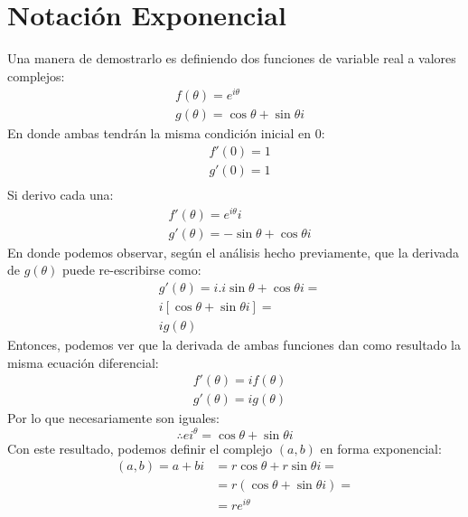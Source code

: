 \documentclass[12pt, twocolumn]{article}
\begin{document}
\section{Notación Exponencial}
Una manera de demostrarlo es definiendo dos funciones de variable real a valores complejos:
\begin{equation*}
    \begin{aligned}
        &f(\theta)=e^{i\theta}\\
        &g(\theta)=\cos{\theta}+\sin{\theta}i
    \end{aligned}
\end{equation*}
En donde ambas tendrán la misma condición inicial en 0:
\begin{equation*}
    \begin{aligned}
        &f'(0)=1\\
        &g'(0)=1\\
    \end{aligned}
\end{equation*}
Si derivo cada una:
\begin{equation*}
    \begin{aligned}
        &f'(\theta)=e^{i\theta}i\\
        &g'(\theta)=-\sin{\theta}+\cos{\theta}i
    \end{aligned}
\end{equation*}
En donde podemos observar, según el análisis hecho previamente, que la derivada de $g(\theta)$ puede re-escribirse como:
\begin{equation*}
    \begin{aligned}
        &g'(\theta)=i.i\sin{\theta}+\cos{\theta}i=\\
        &i[\cos{\theta}+\sin{\theta}i]=\\    
        &ig(\theta)
    \end{aligned}
\end{equation*}  
Entonces, podemos ver que la derivada de ambas funciones dan como resultado la misma ecuación diferencial:
\begin{equation*}
    \begin{aligned}
        &f'(\theta)=if(\theta)\\
        &g'(\theta)=ig(\theta)     
    \end{aligned}
\end{equation*} 
Por lo que necesariamente son iguales:
$$\therefore ei^{\theta}=\cos{\theta}+\sin{\theta}i$$
Con este resultado, podemos definir el complejo $(a,b)$ en forma exponencial:
\begin{equation*}
    \begin{aligned}
        (a,b)=a+bi &=r\cos{\theta}+r\sin{\theta}i=\\
                   &=r(\cos{\theta}+\sin{\theta}i)=\\
                   &=\boxed{re^{i\theta}}
    \end{aligned}
\end{equation*}
\end{document}
